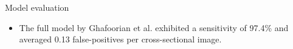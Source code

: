 \documentclass{beamer}
\begin{document}
\begin{frame}{Model evaluation}
\begin{itemize}
    \begin{block}{Sensitivity and Specificity}
	\[
		Sensitivity = P(Correct | Positive)
	\]
	\[
		Specificity = P(Correct | Negative)
	\]
    \end{block}
\item The full model by Ghafoorian et al. exhibited a sensitivity of 97.4\% and averaged 0.13 false-positives per cross-sectional image.
\end{itemize}

\end{frame}



\end{document}

